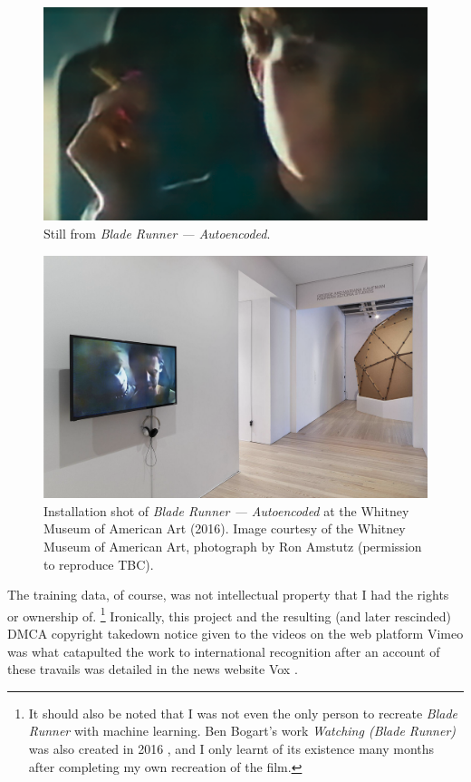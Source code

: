 \begin{figure}[!htb]
    \centering
    \captionsetup{justification=centering}
    \includegraphics[width=1\textwidth]{figures/c1_intro/blade_runner_still.png}
    \caption{Still from \textit{Blade Runner --- Autoencoded}.}
    \label{fig:c1:blade-runner}
\end{figure}

\begin{figure}[!htb]
    \centering
    \captionsetup{justification=centering}
    \includegraphics[width=1\textwidth]{figures/c1_intro/whitney-installation-shot.png}
    \caption[Installation shot of of \textit{Blade Runner --- Autoencoded}]{Installation shot of \textit{Blade Runner --- Autoencoded} at the Whitney Museum of American Art (2016). Image courtesy of the Whitney Museum of American Art, photograph by Ron Amstutz (permission to reproduce TBC).}
    \label{fig:c1:blade-runner-whitney}
\end{figure}

The training data, of course, was not intellectual property that I had the rights or ownership of. \footnote{It should also be noted that I was not even the only person to recreate \textit{Blade Runner} with machine learning. Ben Bogart's work \textit{Watching (Blade Runner)} was also created in 2016 \citep{bogart2016watching}, and I only learnt of its existence many months after completing my own recreation of the film.}
Ironically, this project and the resulting (and later rescinded) DMCA copyright takedown notice given to the videos on the web platform Vimeo was what catapulted the work to international recognition after an account of these travails was detailed in the news website Vox \citep{romano2016bladerunner}.

